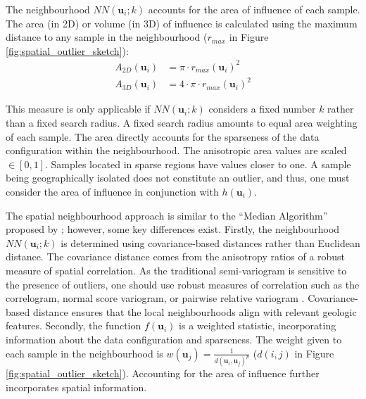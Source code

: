 The neighbourhood $NN(\mathbf{u}_{i}; k)$ accounts for the area of influence of each sample. The area (in \acrshort{2D}) or volume (in \acrshort{3D}) of influence is calculated using the maximum distance to any sample in the neighbourhood ($r_{max}$ in Figure \ref{fig:spatial_outlier_sketch}):
\begin{align}
    A_{2D}(\mathbf{u}_{i}) & = \pi \cdot r_{max}(\mathbf{u}_{i})^{2}         \\
    A_{3D}(\mathbf{u}_{i}) & = 4 \cdot \pi \cdot r_{max}(\mathbf{u}_{i})^{2}
    \label{eq:aoi}
\end{align}

This measure is only applicable if $NN(\mathbf{u}_{i}; k)$ considers a fixed number $k$ rather than a fixed search radius. A fixed search radius amounts to equal area weighting of each sample. The area directly accounts for the sparseness of the data configuration within the neighbourhood. The anisotropic area values are scaled $\in [0,1]$. Samples located in sparse regions have values closer to one. A sample being geographically isolated does not constitute an outlier, and thus, one must consider the area of influence in conjunction with $h(\mathbf{u}_{i})$.

The spatial neighbourhood approach is similar to the ``Median Algorithm'' proposed by \cite{chen2008detecting}; however, some key differences exist. Firstly, the neighbourhood $NN(\mathbf{u}_{i}; k)$ is determined using covariance-based distances rather than Euclidean distance. The covariance distance comes from the anisotropy ratios of a robust measure of spatial correlation. As the traditional semi-variogram is sensitive to the presence of outliers, one should use robust measures of correlation such as the correlogram, normal score variogram, or pairwise relative variogram \citep{babakhani2014geostatistical,drumond2019using}. Covariance-based distance ensures that the local neighbourhoods align with relevant geologic features. Secondly, the function $f(\mathbf{u}_{i})$ is a weighted statistic, incorporating information about the data configuration and sparseness. The weight given to each sample in the neighbourhood is $w(\mathbf{u}_{j})=\frac{1}{d(\mathbf{u}_{i},\mathbf{u}_{j})^{p}}$ ($d(i,j)$ in Figure \ref{fig:spatial_outlier_sketch}). Accounting for the area of influence further incorporates spatial information.


